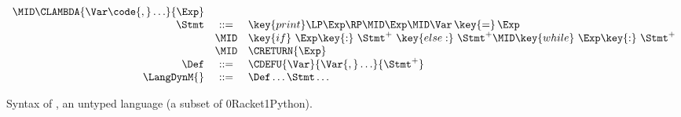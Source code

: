 \documentclass[7x10,nocrop]{TimesAPriori_MIT}%
\def\racketEd{0}
\def\pythonEd{1}
\def\edition{0}
\newcommand{\racket}[1]{{\if\edition\racketEd{#1}\fi}}
\newcommand{\python}[1]{{\if\edition\pythonEd #1\fi}}
\begin{document}
\begin{figure}[tp]
{\begin{minipage}{0.97\textwidth}
{\[\begin{array}{rcl}
    \MID \CLAMBDA{\Var\code{, }\ldots}{\Exp}\\
  \Stmt &::=& \key{print}\LP \Exp \RP \MID \Exp 
    \MID \Var\mathop{\key{=}}\Exp \\
   &\MID& \key{if}~ \Exp \key{:}~ \Stmt^{+} ~\key{else:}~ \Stmt^{+} 
   \MID \key{while}~ \Exp \key{:}~ \Stmt^{+} \\
    &\MID& \CRETURN{\Exp} \\
   \Def &::=& \CDEFU{\Var}{\Var{,} \ldots}{\Stmt^{+}} \\
  \LangDynM{} &::=& \Def\ldots \Stmt\ldots
\end{array}
\]
\fi}
\end{minipage}
}
\caption{Syntax of \LangDyn{}, an untyped language (a subset of \racket{Racket}\python{Python}).}
\label{fig:r7-concrete-syntax}
\end{figure}
\end{document}
